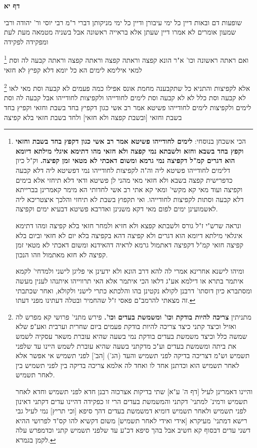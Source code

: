 \documentclass[12pt, openany]{book}
\newcommand{\sethebfont}{
\fontsize{10.5pt}{21.0pt} \selectfont
}
\newcommand{\twocol}[1]{
	{\sethebfont \begin{multicols}{2}
			#1
	\end{multicols}}	
}
\newcommand{\sectname}{}
\newcommand{\newsection}[1]{
	\addcontentsline{toc}{section}{#1}
	\renewcommand{\sectname}{#1}	
	\vspace{-\baselineskip}
	\begin{center}
		\textbf{%
\fontsize{16pt}{16pt}\selectfont
			#1}
	\end{center}
	\vspace{-\baselineskip}
	\nopagebreak
}
\newcommand{\footnotecomment}[1]{
	\renewcommand\thefootnote{}
	\footnote{#1}}
\newcommand{\commenta}[1]{\footnotecomment{#1}}
\begin{document}
\newsection{דף יא}
\twocol{שופעות דם ובאות דיין כל ימי עיבורן ודיין כל ימי מניקותן דברי ר"מ רבי יוסי ור' יהודה ורבי שמעון אומרים לא אמרו דיין שעתן אלא בראייה ראשונה אבל בשניה מטמאה מעת לעת ומפקידה לפקידה
\commenta{ הכי אשכחן בנוסחי: \textbf{לימים לחודייהו פשיטא אמר רב אשי כגון דקפץ בחד בשבת וחזאי וקפץ בחד בשבא וחזא ולשבתא נמי קפצה ולא חזאי מהו דתימא איגלי מילתא דיומא הוא דגרים קמ"ל דקפיצה נמי גרמא ומשום דאכתי לא מטאי זמן קפיצה.} וק"ל כיון דלימים לחודייהו פשיטא ליה וה"ה לקפיצות לחודייהו נמי דפשיטא ליה דלא קבעה כדפרישית קפצה בשבא ולא חזאי מאי מהני לן פשיטא ודאי דלא תיחזי אלא בימים וקפיצה ועוד מאי קא מקשי' ומאי קא אתי רב אשי לחדותי הא מימר קאמרינן בברייתא דלא קבעה וסתות לקפיצות לחודייהו. ואי תקפוץ בשבת לא תיחזי והלכך איצטריכא ליה לאשמועינן ימים לפום מאי דקא משנינן ואדרבא פשיטא דבעיא ימים וקפיצה.\par ונראה שרש"י ז"ל גורס ולשבתא קפצא ולא חזיא ולמחר חזאי בלא קפיצה ומהו דתימא איגלאי מילתא דיומא הוא דגרים ולא קפיצה דהא בקפיצה בלא יום לא חזאי וביום בלא קפיצה חזאי קמ"ל דקפיצה דאתמול גרמא לראיה דהאידנא ומשום דאכתי לא מטאי זמן קפיצה לא חזא מאתמול וזהו הנכון.\par ומיהו לישנא אחרינא אמרי לה להא דרב הונא ולא ידעינן אי פליגן לישני ולמדחי' לקמא איתמר בתרא או דילמא אע"ג דלאו הכי איתמר אלא האי תרווייהו איתנהו לענין מעשה ומסתברא כיון דוסתו' דרבנן לקולא נקטינן בהו והלכתא כתרי לישני ולקולא, ואחר שכתבתי זה מצאתי להרמב"ם פאסי ז"ל שהחמיר ובטלה דעתינו מפני דעתו. }
ואם ראתה ראשונה וכו' א"ר הונא קפצה וראתה קפצה וראתה קפצה וראתה קבעה לה וסת למאי אילימא לימים הא כל יומא דלא קפיץ לא חזאי 
\commenta{ מתניתין \textbf{צריכה להיות בודקת וכו' ומשמשת בעדים וכו'.} פירש מתני' פרושי קא מפרש לה ואזיל וכיצד קתני כיצד צריכה להיות בודקת פעמים ביום שחרית וערבית ואע"פ שלא שמשה כלל וכיצד משמשת בעדים בודקת נמי בשעה שהיא עוברת משאר עסקיה לשמש את ביתה ומשמשת בעדים וע"כ מדקתני בשעה שהיא עוברת לשמש היינו עד שלפני תשמיש וש"מ דצריכה בדיקה לפני תשמיש והעד (הג') [הב'] לפני תשמיש אי אפשר אלא לאחר תשמיש הוא וכדתנן אחד לו ואחד לה אלמא צריכה בדיקה בין לפני תשמיש בין לאחר תשמיש.\par והיינו דאמרינן לעיל [דף ה' ע"א] שתי בדיקות אצרכוה רבנן חדא לפני תשמיש וחדא לאחר תשמיש ורמינ' למתני' דקתני והמשמשת בעדים הרי זו כפקידה דהיינו עדים דקתני דאינון לפני תשמיש ולאחר תשמיש דומיא דמשמשת בעדים דהך סיפא [וכי תריץ] נמי לעיל גבי רישא דמתני' מעיקרא [אידי ואידי לאחר תשמיש] משום דקשיא להו קס"ד לפרושי ההיא דשני עדים דבסוף קא חשיב אבל בהך סיפא דכ"ע עד שלפני תשמיש קתני וכדמפרש עלה לקמן בגמרא. }
אלא לקפיצות והתניא כל שתקבענה מחמת אונס אפילו כמה פעמים לא קבעה וסת מאי לאו לא קבעה וסת כלל 
לא לא קבעה וסת לימים לחודייהו ולקפיצות לחודייהו אבל קבעה לה וסת לימים ולקפיצות לימים לחודייהו פשיטא אמר רב אשי כגון דקפיץ בחד בשבת וחזאי וקפיץ בחד בשבת וחזאי [ובשבת קפצה ולא חזאי] ולחד בשבת חזאי בלא קפיצה 
}
\end{document}
